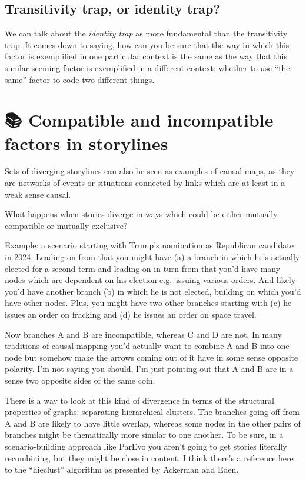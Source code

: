 \documentclass[
]{book}
\begin{document}
\hypertarget{transitivity-trap-or-identity-trap}{%
\section{Transitivity trap, or identity trap?}\label{transitivity-trap-or-identity-trap}}

We can talk about the \emph{identity trap} as more fundamental than the transitivity trap. It comes down to saying, how can you be sure that the way in which this factor is exemplified in one particular context is the same as the way that this similar seeming factor is exemplified in a different context: whether to use ``the same'' factor to code two different things.

\hypertarget{compatible-and-incompatible-factors-in-storylines}{%
\chapter{📚 Compatible and incompatible factors in storylines}\label{compatible-and-incompatible-factors-in-storylines}}

Sets of diverging storylines can also be seen as examples of causal maps, as they are networks of events or situations connected by links which are at least in a weak sense causal.

What happens when stories diverge in ways which could be either mutually compatible or mutually exclusive?

Example: a scenario starting with Trump's nomination as Republican candidate in 2024. Leading on from that you might have (a) a branch in which he's actually elected for a second term and leading on in turn from that you'd have many nodes which are dependent on his election e.g.~issuing various orders. And likely you'd have another branch (b) in which he is not elected, building on which you'd have other nodes. Plus, you might have two other branches starting with (c) he issues an order on fracking and (d) he issues an order on space travel.

Now branches A and B are incompatible, whereas C and D are not. In many traditions of causal mapping you'd actually want to combine A and B into one node but somehow make the arrows coming out of it have in some sense opposite polarity. I'm not saying you should, I'm just pointing out that A and B are in a sense two opposite sides of the same coin.

There is a way to look at this kind of divergence in terms of the structural properties of graphs: separating hierarchical clusters. The branches going off from A and B are likely to have little overlap, whereas some nodes in the other pairs of branches might be thematically more similar to one another. To be sure, in a scenario-building approach like ParEvo you aren't going to get stories literally recombining, but they might be close in content. I think there's a reference here to the ``hieclust'' algorithm as presented by Ackerman and Eden.
\end{document}
